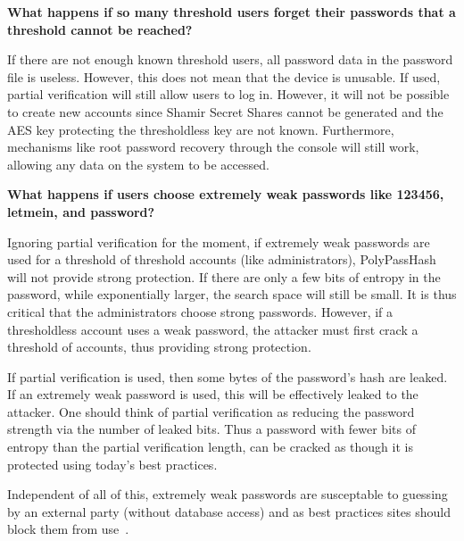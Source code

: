 {\bf What happens if so many threshold users forget their passwords that a
threshold cannot be reached?}

If there are not enough known threshold users, all password data in the
password file is useless.   However, this does not mean that the device is
unusable.   If used, partial verification will still allow users to log in.   
However, it will not be possible to create new accounts since Shamir
Secret Shares cannot be generated and the AES key protecting the thresholdless
key are not known.  Furthermore, mechanisms like root password recovery through
the console will still work, allowing any data on the system to be accessed.




%



{\bf What happens if users choose extremely weak passwords like 123456, 
letmein, and password?}

Ignoring partial verification for the moment, 
if extremely weak passwords are used for a threshold of threshold accounts 
(like administrators), PolyPassHash will not provide strong protection.   If
there are only a few bits of entropy in the password, while exponentially
larger, the search space will still be small.   It is thus critical that
the administrators choose strong passwords.   However,
if a thresholdless account uses a weak password, the attacker must first
crack a threshold of accounts, thus providing strong protection.

If partial verification is used, then some bytes of the password's 
hash are leaked.   If an extremely weak password is used, this
will be effectively leaked to the attacker.   One should think of partial
verification as reducing the password strength via the number of leaked
bits.   Thus a password with fewer bits of entropy than the partial 
verification length, can be cracked as though it is protected using today's
best practices.


Independent of all of this, extremely weak passwords are susceptable to 
guessing by an external party (without database access) and as best practices
sites should block them from use~\cite{bancommonpasswords}.




